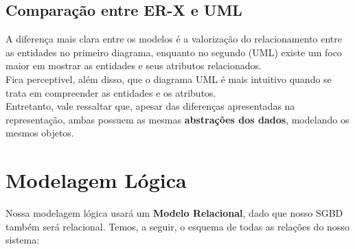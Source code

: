 \documentclass{article}
\begin{document}
	\subsection{Comparação entre ER-X e UML}
	A diferença mais clara entre os modelos é a valorização do relacionamento entre as entidades no primeiro diagrama, enquanto no segundo (UML) existe um foco maior em mostrar as entidades e seus atributos relacionados.\\
	Fica perceptivel, além disso, que o diagrama UML é mais intuitivo quando se trata em compreender as entidades e os atributos. \\
	Entretanto, vale ressaltar que, apesar das diferenças apresentadas na representação, ambas possuem as mesmas \textbf{abstrações dos dados}, modelando os mesmos objetos.

\section{Modelagem Lógica}
	Nossa modelagem lógica usará um \textbf{Modelo Relacional}, dado que nosso SGBD também será relacional. Temos, a seguir, o esquema de todas as relações do nosso sistema:\\
\end{document}
